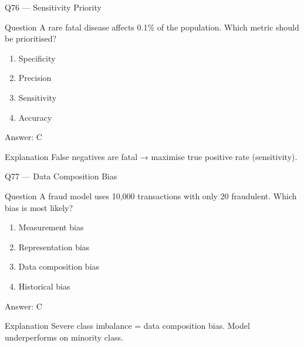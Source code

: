 \documentclass[aspectratio=169,8pt]{beamer}
\begin{document}
	\begin{frame}{Q76 --- Sensitivity Priority}
		\begin{block}{Question}
			A rare fatal disease affects 0.1\% of the population. Which metric should be prioritised?
		\end{block}
		\begin{enumerate}
			\item Specificity
			\item Precision
			\item Sensitivity
			\item Accuracy
		\end{enumerate}
		\begin{exampleblock}{Answer: C}\end{exampleblock}
		\begin{block}{Explanation}
			False negatives are fatal → maximise true positive rate (sensitivity).
		\end{block}
	\end{frame}
	
	\begin{frame}{Q77 --- Data Composition Bias}
		\begin{block}{Question}
			A fraud model uses 10,000 transactions with only 20 fraudulent. Which bias is most likely?
		\end{block}
		\begin{enumerate}
			\item Measurement bias
			\item Representation bias
			\item Data composition bias
			\item Historical bias
		\end{enumerate}
		\begin{exampleblock}{Answer: C}\end{exampleblock}
		\begin{block}{Explanation}
			Severe class imbalance = data composition bias. Model underperforms on minority class.
		\end{block}
	\end{frame}
	
\end{document}
